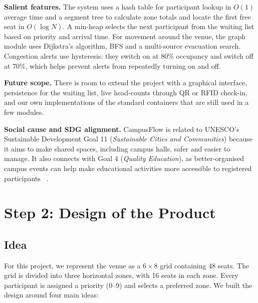 \documentclass[11pt,a4paper]{article}
\begin{document}
\textbf{Salient features.}
The system uses a hash table for participant lookup in $O(1)$ average time and
a segment tree to calculate zone totals and locate the first free seat in
$O(\log N)$. A min-heap selects the next participant from the waiting list
based on priority and arrival time. For movement around the venue, the graph
module uses Dijkstra's algorithm, BFS and a multi-source evacuation search.
Congestion alerts use hysteresis: they switch on at 80\% occupancy and switch
off at 70\%, which helps prevent alerts from repeatedly turning on and off.

\textbf{Future scope.}
There is room to extend the project with a graphical interface, persistence for
the waiting list, live head-counts through QR or RFID check-in, and our own
implementations of the standard containers that are still used in a few modules.

\textbf{Social cause and SDG alignment.}
CampusFlow is related to UNESCO's Sustainable Development Goal 11
(\emph{Sustainable Cities and Communities}) because it aims to make shared
spaces, including campus halls, safer and easier to manage. It also connects
with Goal 4 (\emph{Quality Education}), as better-organised campus events can
help make educational activities more accessible to registered participants
~\cite{unesco-sdg}.

\section{Step 2: Design of the Product}

\subsection{Idea}
For this project, we represent the venue as a $6\times 8$ grid containing
48 seats. The grid is divided into three horizontal zones, with 16 seats in
each zone. Every participant is assigned a priority (0--9) and selects a
preferred zone. We built the design around four main ideas:
\end{document}
